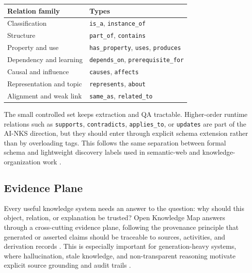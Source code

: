 \documentclass[11pt,letterpaper]{article}
\newcommand{\code}[1]{\nolinkurl{#1}}
\newcommand{\OKM}{Open Knowledge Map}
\begin{document}
\begin{center}
\small
\begin{tabularx}{\textwidth}{@{}lY@{}}
\toprule
\textbf{Relation family} & \textbf{Types}\\
\midrule
Classification & \code{is_a}, \code{instance_of}\\
Structure & \code{part_of}, \code{contains}\\
Property and use & \code{has_property}, \code{uses}, \code{produces}\\
Dependency and learning & \code{depends_on}, \code{prerequisite_for}\\
Causal and influence & \code{causes}, \code{affects}\\
Representation and topic & \code{represents}, \code{about}\\
Alignment and weak link & \code{same_as}, \code{related_to}\\
\bottomrule
\end{tabularx}
\end{center}

The small controlled set keeps extraction and QA tractable. Higher-order runtime relations such as \code{supports}, \code{contradicts}, \code{applies_to}, or \code{updates} are part of the AI-NKS direction, but they should enter through explicit schema extension rather than by overloading tags. This follows the same separation between formal schema and lightweight discovery labels used in semantic-web and knowledge-organization work \cite{rdf,owl,skos,shacl}.

\subsection{Evidence Plane}

Every useful knowledge system needs an answer to the question: why should this object, relation, or explanation be trusted? \OKM{} answers through a cross-cutting evidence plane, following the provenance principle that generated or asserted claims should be traceable to sources, activities, and derivation records \cite{prov}. This is especially important for generation-heavy systems, where hallucination, stale knowledge, and non-transparent reasoning motivate explicit source grounding and audit trails \cite{ji-hallucination,gao-rag-survey}.
\end{document}
